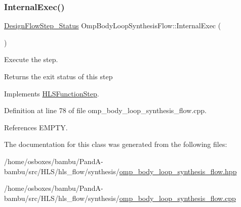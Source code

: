 \subsubsection{\texorpdfstring{Internal\+Exec()}{InternalExec()}}
{\footnotesize\ttfamily \hyperlink{design__flow__step_8hpp_afb1f0d73069c26076b8d31dbc8ebecdf}{Design\+Flow\+Step\+\_\+\+Status} Omp\+Body\+Loop\+Synthesis\+Flow\+::\+Internal\+Exec (\begin{DoxyParamCaption}{ }\end{DoxyParamCaption})\hspace{0.3cm}{\ttfamily [virtual]}}



Execute the step. 

\begin{DoxyReturn}{Returns}
the exit status of this step 
\end{DoxyReturn}


Implements \hyperlink{classHLSFunctionStep_a8db4c00d080655984d98143206fc9fa8}{H\+L\+S\+Function\+Step}.



Definition at line 78 of file omp\+\_\+body\+\_\+loop\+\_\+synthesis\+\_\+flow.\+cpp.



References E\+M\+P\+TY.



The documentation for this class was generated from the following files\+:\begin{DoxyCompactItemize}
\item 
/home/osboxes/bambu/\+Pand\+A-\/bambu/src/\+H\+L\+S/hls\+\_\+flow/synthesis/\hyperlink{omp__body__loop__synthesis__flow_8hpp}{omp\+\_\+body\+\_\+loop\+\_\+synthesis\+\_\+flow.\+hpp}\item 
/home/osboxes/bambu/\+Pand\+A-\/bambu/src/\+H\+L\+S/hls\+\_\+flow/synthesis/\hyperlink{omp__body__loop__synthesis__flow_8cpp}{omp\+\_\+body\+\_\+loop\+\_\+synthesis\+\_\+flow.\+cpp}\end{DoxyCompactItemize}
